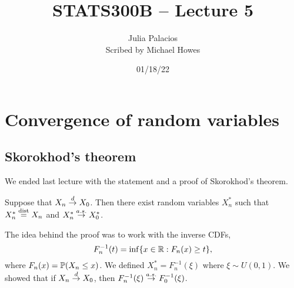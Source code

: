 




\title{STATS300B -- Lecture 5}
\author{Julia Palacios\\ Scribed by Michael Howes}
\date{01/18/22}

\pagestyle{fancy}
\fancyhf{}


\maketitle
\tableofcontents
\section{Convergence of random variables}
\subsection{Skorokhod's theorem}
We ended last lecture with the statement and a proof of Skorokhod's theorem.
\begin{theorem}[Skorokhod]
    Suppose that $X_n \stackrel{d}{\to} X_0$. Then there exist random variables $X_n^*$ such that $X_n^* \stackrel{\mathrm{dist}}{=} X_n$ and $X_n^* \stackrel{a.s.}{\to} X_0^*$.
\end{theorem}
The idea behind the proof was to work with the inverse CDFs, 
\[F_n^{-1}(t) = \inf\{x \in {\mathbb R} : F_n(x) \ge t\}, \]
where $F_n(x) = {\mathbb{P}}(X_n \le x)$. We defined $X_n^* = F_n^{-1}(\xi)$ where $\xi \sim U(0,1)$. We showed that if $X_n \stackrel{d}{\to} X_0$, then $F_n^{-1}(\xi) \stackrel{a.s.}{\to} F_0^{-1}(\xi)$.

